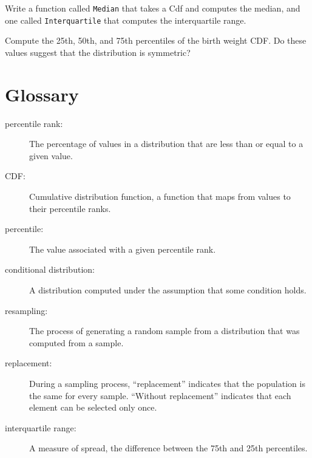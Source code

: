 \documentclass[12pt]{book}
\begin{document}
\begin{exercise}
Write a function called {\tt Median} that takes a Cdf and computes the
median, and one called {\tt Interquartile} that computes
the interquartile range.

Compute the 25th, 50th, and 75th percentiles of the birth weight
CDF.  Do these values suggest that the distribution is symmetric?



\end{exercise}


\section{Glossary}

\begin{description}

\item[percentile rank:] The percentage of values in a distribution that are
less than or equal to a given value.

\item[CDF:] Cumulative distribution function, a function that maps
  from values to their percentile ranks.

\item[percentile:] The value associated with a given percentile rank.

\item[conditional distribution:] A distribution computed under the assumption
that some condition holds.

\item[resampling:] The process of generating a random sample from a
distribution that was computed from a sample.

\item[replacement:] During a sampling process, ``replacement'' indicates
that the population is the same for every sample.  ``Without replacement''
indicates that each element can be selected only once.

\item[interquartile range:] A measure of spread, the difference between
the 75th and 25th percentiles.

\end{description}
\end{document}
